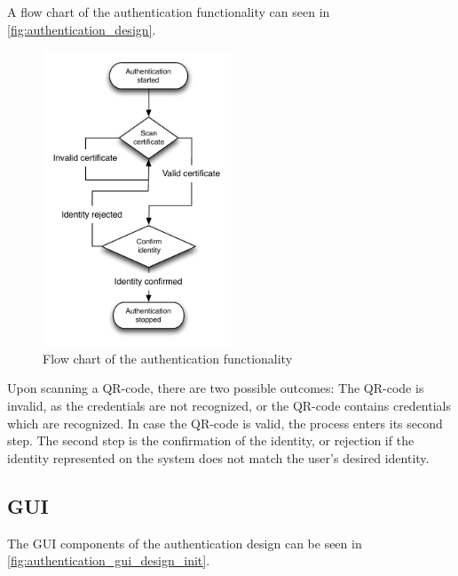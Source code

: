 A flow chart of the authentication functionality can seen in \autoref{fig:authentication_design}.
\begin{figure}[h]
	\centering
	\includegraphics[width=0.5\textwidth]{gfx/authentication_design.pdf}
	\caption{Flow chart of the authentication functionality}
	\label{fig:authentication_design}
\end{figure}

Upon scanning a QR-code, there are two possible outcomes: The QR-code is invalid, as the credentials are not recognized, or the QR-code contains credentials which are recognized.
In case the QR-code is valid, the process enters its second step. The second step is the confirmation of the identity, or rejection if the identity represented on the system does not match the user's desired identity.

\subsection{GUI}
The GUI components of the authentication design can be seen in \autoref{fig:authentication_gui_design_init}.

